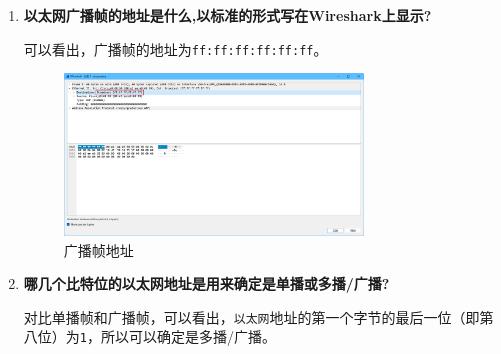 \documentclass{article}
\begin{document}
\begin{enumerate}[noitemsep]
  \item \textbf{以太网广播帧的地址是什么,以标准的形式写在Wireshark上显示?}

        可以看出，广播帧的地址为\texttt{ff:ff:ff:ff:ff:ff}。

        \begin{figure}[H]
          \centering
          \includegraphics[width=0.75\textwidth]{images/14.png}
          \caption{广播帧地址}
        \end{figure}

  \item \textbf{哪几个比特位的以太网地址是用来确定是单播或多播/广播?}

        对比单播帧和广播帧，可以看出，\texttt{以太网}地址的第一个字节的最后一位（即第八位）为\texttt{1}，所以可以确定是多播/广播。


\end{enumerate}
\end{document}

